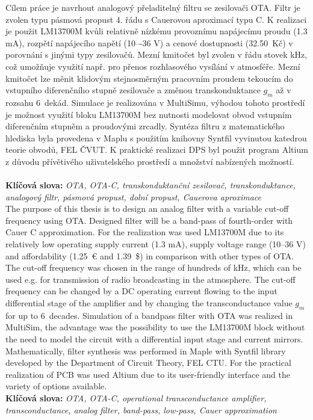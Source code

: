 \noindent Cílem práce je navrhout analogový přeladitelný filtru se zesilovači OTA. Filtr je zvolen typu pásmová propust 4. řádu s Cauerovou aproximací typu C. K realizaci je použit LM13700M kvůli relativně nízkému provoznímu napájecímu proudu (1.3 mA), rozpětí napájecího napětí (10–-36 V) a cenové dostupnosti (32.50\ Kč) v porovnání s jinými typy zesilovačů. Mezní kmitočet byl zvolen v řádu stovek kHz, což umožňuje využití např. pro přenos rozhlasového vysílání v atmosféře. Mezní kmitočet lze měnit klidovým stejnosměrným pracovním proudem tekoucím do vstupního diferenčního stupně zesilovače a změnou transkonduktance $g_m$ až v rozsahu 6~dekád. Simulace je realizována v MultiSimu, výhodou tohoto prostředí je možnost využití bloku LM13700M bez nutnosti modelovat obvod vstupním diferenčním stupněm a proudovými zrcadly. Syntéza filtru z matematického hlediska byla provedena v Maplu s použitím knihovny Syntfil vyvinutou katedrou teorie obvodů, FEL ČVUT. K praktické realizaci DPS byl použit program Altium z důvodu přívětivého uživatelského prostředí a množství nabízených možností. \\
\\
\noindent \textbf{Klíčová slova:} \textit{OTA, OTA-C, transkonduktanční zesilovač, transkonduktance, analogový filtr, pásmová propust, dolní propust, Cauerova aproximace}\\

\noindent The purpose of this thesis is to design an analog filter with a variable cut-off frequency using OTA. Designed filter will be a band-pass of fourth-order with Cauer C approximation. For the realization was used LM13700M due to its relatively low operating supply current (1.3 mA), supply voltage range (10--36 V) and affordability (1.25\ \euro{} and 1.39\ \$) in comparison with other types of OTA. The cut-off frequency was chosen in the range of hundreds of kHz, which can be used e.g. for transmission of radio broadcasting in the atmosphere. The cut-off frequency can be changed by a DC operating current flowing to the input differential stage of the amplifier and by changing the transconductance value $g_m$ for up to 6~decades. Simulation of a bandpass filter with OTA was realized in MultiSim, the advantage was the possibility to use the LM13700M block without the need to model the circuit with a differential input stage and current mirrors. Mathematically, filter synthesis was performed in Maple with Syntfil library developed by the Department of Circuit Theory, FEL CTU. For the practical realization of PCB was used Altium due to its user-friendly interface and the variety of options available. \\

\noindent \textbf{Klíčová slova:} \textit{OTA, OTA-C, operational transconductance amplifier, transconductance, analog filter, band-pass, low-pass, Cauer approximation} \\